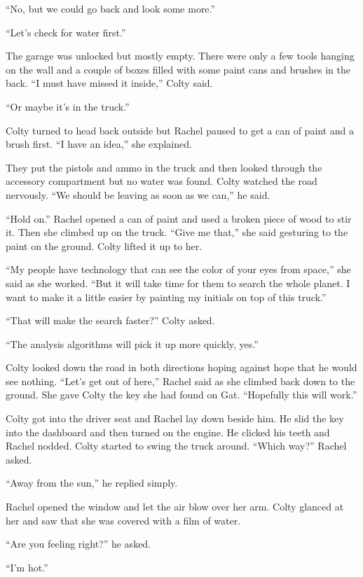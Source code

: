 ``No, but we could go back and look some more.''

``Let's check for water first.''

The garage was unlocked but mostly empty. There were only a few tools hanging on the wall and a
couple of boxes filled with some paint cans and brushes in the back. ``I must have missed it
inside,'' Colty said.

``Or maybe it's in the truck.''

Colty turned to head back outside but Rachel paused to get a can of paint and a brush first. ``I
have an idea,'' she explained.

They put the pistols and ammo in the truck and then looked through the accessory compartment but
no water was found. Colty watched the road nervously. ``We should be leaving as soon as we
can,'' he said.

``Hold on.'' Rachel opened a can of paint and used a broken piece of wood to stir it. Then she
climbed up on the truck. ``Give me that,'' she said gesturing to the paint on the ground. Colty
lifted it up to her.

``My people have technology that can see the color of your eyes from space,'' she said as she
worked. ``But it will take time for them to search the whole planet. I want to make it a little
easier by painting my initials on top of this truck.''

``That will make the search faster?'' Colty asked.

``The analysis algorithms will pick it up more quickly, yes.''

Colty looked down the road in both directions hoping against hope that he would see nothing.
``Let's get out of here,'' Rachel said as she climbed back down to the ground. She gave Colty
the key she had found on Gat. ``Hopefully this will work.''

Colty got into the driver seat and Rachel lay down beside him. He slid the key into the
dashboard and then turned on the engine. He clicked his teeth and Rachel nodded. Colty started
to swing the truck around. ``Which way?'' Rachel asked.

``Away from the sun,'' he replied simply.

\breakpoint

Rachel opened the window and let the air blow over her arm. Colty glanced at her and saw that
she was covered with a film of water.

``Are you feeling right?'' he asked.

``I'm hot.''

